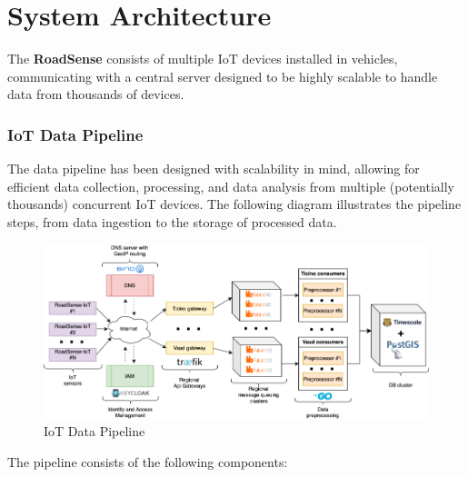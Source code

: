 \section{System Architecture}

The \textbf{RoadSense} consists of multiple IoT devices installed in vehicles, communicating with a central server designed to be highly scalable to handle data from thousands of devices.

\subsubsection{IoT Data Pipeline}

The data pipeline has been designed with scalability in mind, allowing for efficient data collection, processing, and data analysis from multiple (potentially thousands) concurrent IoT devices. The following diagram illustrates the pipeline steps, from data ingestion to the storage of processed data.

\begin{figure}[h!]
    \centering
    \includegraphics[width=\textwidth]{../../assets/diagrams/iot_data_pipeline/iot_data_pipeline.png}
    \caption{IoT Data Pipeline}
\end{figure}

The pipeline consists of the following components:

